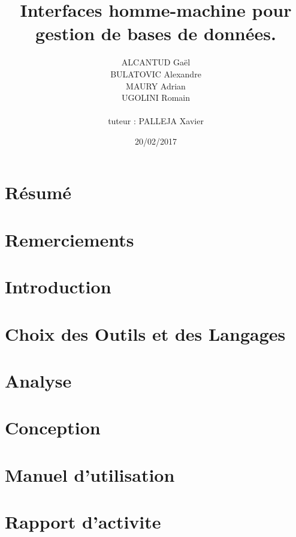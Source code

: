 \documentclass[12pt, a4paper, twoside, openright]{book}
\title{Interfaces homme-machine pour gestion de bases de données.}
\author{ALCANTUD Gaël \\ BULATOVIC Alexandre \\ MAURY Adrian \\ UGOLINI Romain \\ \\tuteur : PALLEJA Xavier}
\date{20/02/2017}
\begin{document}
\frontmatter
\maketitle

\thispagestyle{empty}
\chapter*{Résumé}


\thispagestyle{empty}
\chapter*{Remerciements}


\tableofcontents
\listoffigures
\printglossaries

\mainmatter
\chapter{Introduction}


\chapter{Choix des Outils et des Langages}


\chapter{Analyse}


\chapter{Conception}


\chapter{Manuel d'utilisation}


\chapter{Rapport d'activite}


\backmatter
\end{document}
